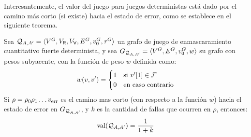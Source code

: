 Interesantemente, el valor del juego para juegos deterministas está dado por el camino más corto (si existe) hacia el estado de error, como se establece en el siguiente teorema.
\begin{theorem}\label{thm:det-games} Sea  $\QMStrGame = \langle V^G, V_\Refuter,V_\Verifier, E^G, \InitVertex^G, \reward^G \rangle$ un grafo de juego de enmascaramiento cuantitativo fuerte determinista,
y sea  $G_{\QMStrGame} = \langle V^G,  E^G, \InitVertex^G, w \rangle$ su grafo con pesos subyacente, con la función de peso $w$ 
definida como:
\[
w(v, v') =
\begin{cases} 1 & \text{si $\pr{1}{v'} \in \Faults$} \\
		      0 & \text{en caso contrario}	 
\end{cases}
\]
	Si $\rho = \rho_0 \rho_1  \dots \ErrorSt$ es el camino mas corto (con respecto a la función $w$)
hacia el estado de error en $G_{\QMStrGame}$, y $k$ es la cantidad de fallas que ocurren en $\rho$, entonces: 
\[
	\val(\QMStrGame) = \frac{1}{1+k}
\]
\end{theorem}
\iffalse
